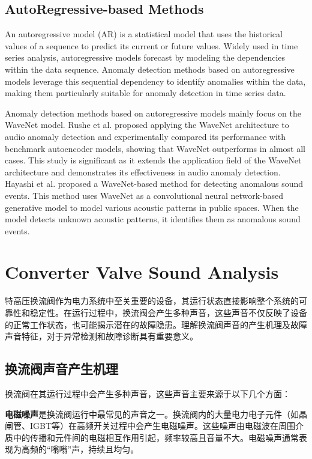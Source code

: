 \documentclass{article}
\begin{document}
\subsection{AutoRegressive-based Methods}

An autoregressive model (AR) is a statistical model that uses the historical values of a sequence to predict its current or future values. Widely used in time series analysis, autoregressive models forecast by modeling the dependencies within the data sequence. Anomaly detection methods based on autoregressive models leverage this sequential dependency to identify anomalies within the data, making them particularly suitable for anomaly detection in time series data.

Anomaly detection methods based on autoregressive models mainly focus on the WaveNet model\cite{WaveNet-AD,AR-AD}. Rushe et al.\cite{AR-AD} proposed applying the WaveNet architecture to audio anomaly detection and experimentally compared its performance with benchmark autoencoder models, showing that WaveNet outperforms in almost all cases. This study is significant as it extends the application field of the WaveNet architecture and demonstrates its effectiveness in audio anomaly detection. Hayashi et al.\cite{WaveNet-AD} proposed a WaveNet-based method for detecting anomalous sound events. This method uses WaveNet as a convolutional neural network-based generative model to model various acoustic patterns in public spaces. When the model detects unknown acoustic patterns, it identifies them as anomalous sound events.



\section{Converter Valve Sound Analysis}

特高压换流阀作为电力系统中至关重要的设备，其运行状态直接影响整个系统的可靠性和稳定性。在运行过程中，换流阀会产生多种声音，这些声音不仅反映了设备的正常工作状态，也可能揭示潜在的故障隐患。理解换流阀声音的产生机理及故障声音特征，对于异常检测和故障诊断具有重要意义。

\subsection{换流阀声音产生机理}

换流阀在其运行过程中会产生多种声音，这些声音主要来源于以下几个方面：

\textbf{电磁噪声}是换流阀运行中最常见的声音之一。换流阀内的大量电力电子元件（如晶闸管、IGBT等）在高频开关过程中会产生电磁噪声。这些噪声由电磁波在周围介质中的传播和元件间的电磁相互作用引起，频率较高且音量不大。电磁噪声通常表现为高频的“嗡嗡”声，持续且均匀。
\end{document}
